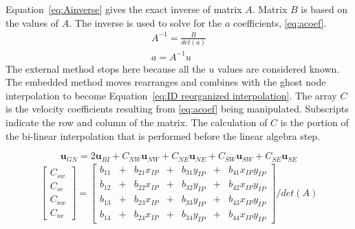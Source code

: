 Equation~\eqref{eq:Ainverse} gives the exact inverse of matrix $A$. 
Matrix $B$ is based on the values of $A$. 
The inverse is used to solve for the $a$ coefficients, \eqref{eq:acoef}.
\begin{align}
A^{-1} = \frac{B}{det(a)}
\label{eq:Ainverse}\\
a=A^{-1}u\;\label{eq:acoef}
\end{align}
The external method stops here because all the $u$ values are considered known. 
The embedded method moves rearranges and combines with the ghost node interpolation to become Equation~\eqref{eq:ID reorganized interpolation}. 
The array $C$ is the velocity coefficients resulting from \eqref{eq:acoef} being manipulated. 
Subscripts indicate the row and column of the matrix. 
The calculation of $C$ is the portion of the bi-linear interpolation that is performed before the linear algebra step. 

\begin{equation}
\textbf{u}_{GN} = 2\textbf{u}_{BI} + C_{NW}\textbf{u}_{NW} + C_{NE}\textbf{u}_{NE} + C_{SW}\textbf{u}_{SW} + C_{SE}\textbf{u}_{SE}\label{eq:ID reorganized interpolation}
\end{equation}
\begin{gather}
	\begin{bmatrix}
		C_{sw}\\
		C_{se}\\
		C_{nw}\\
		C_{ne}
	\end{bmatrix}
=
	\begin{bmatrix}
		b_{11}&+&b_{21}x_{IP}&+&b_{31}y_{IP}&+&b_{41}x_{IP}y_{IP}\\
		b_{12}&+&b_{22}x_{IP}&+&b_{32}y_{IP}&+&b_{42}x_{IP}y_{IP}\\
		b_{13}&+&b_{23}x_{IP}&+&b_{33}y_{IP}&+&b_{43}x_{IP}y_{IP}\\
		b_{14}&+&b_{24}x_{IP}&+&b_{34}y_{IP}&+&b_{44}x_{IP}y_{IP}
	\end{bmatrix}
	/det(A)
\label{eq:ucoef 1}
\end{gather}

